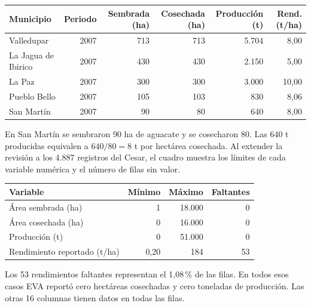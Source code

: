 \documentclass[11pt,a4paper]{article}
\begin{document}
\begin{center}
\begin{minipage}{\linewidth}
\centering\small
\begin{tabular}{lrrrrr}
\toprule
Municipio & Periodo & Sembrada (ha) & Cosechada (ha) & Producción (t) & Rend. (t/ha)\\
\midrule
Valledupar          & 2007 & 713 & 713 & 5.704 & 8,00\\
La Jagua de Ibirico & 2007 & 430 & 430 & 2.150 & 5,00\\
La Paz              & 2007 & 300 & 300 & 3.000 & 10,00\\
Pueblo Bello        & 2007 & 105 & 103 & 830 & 8,06\\
San Martín          & 2007 & 90 & 80 & 640 & 8,00\\
\bottomrule
\end{tabular}
\end{minipage}
\end{center}
En San Martín se sembraron 90 ha de aguacate y se cosecharon 80. Las 640 t producidas
equivalen a \(640/80=8\) t por hectárea cosechada. Al extender la revisión a los 4.887 registros
del Cesar, el cuadro muestra los límites de cada variable numérica y el número de filas sin valor.

\begin{center}
\begin{minipage}{\linewidth}
\centering\small
\begin{tabular}{lrrr}
\toprule
Variable & Mínimo & Máximo & Faltantes\\
\midrule
Área sembrada (ha) & 1 & 18.000 & 0\\
Área cosechada (ha) & 0 & 16.000 & 0\\
Producción (t) & 0 & 51.000 & 0\\
Rendimiento reportado (t/ha) & 0,20 & 184 & 53\\
\bottomrule
\end{tabular}
\end{minipage}
\end{center}

Los 53 rendimientos faltantes representan el 1,08\,\% de las filas. En todos esos casos
EVA reportó cero hectáreas cosechadas y cero toneladas de producción. Las otras 16 columnas
tienen datos en todas las filas.
\end{document}
